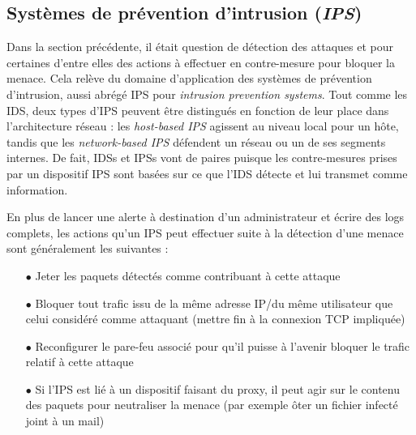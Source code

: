 \documentclass[]{article}
\begin{document}
\subsection{Systèmes de prévention d'intrusion (\textit{IPS})}\label{IPS}
\par Dans la section précédente, il était question de détection des attaques et pour certaines d'entre elles des actions à effectuer en contre-mesure pour bloquer la menace. Cela relève du domaine d'application des systèmes de prévention d'intrusion, aussi abrégé IPS pour \textit{intrusion prevention systems}. Tout comme les IDS, deux types d'IPS peuvent être distingués en fonction de leur place dans l'architecture réseau : les \textit{host-based IPS} agissent au niveau local pour un hôte, tandis que les \textit{network-based IPS} défendent un réseau ou un de ses segments internes. De fait, IDSs et IPSs vont de paires puisque les contre-mesures prises par un dispositif IPS sont basées sur ce que l'IDS détecte et lui transmet comme information.
\vspace{0.2cm}
\par En plus de lancer une alerte à destination d'un administrateur et écrire des logs complets,  les actions qu'un IPS peut effectuer suite à la détection d'une menace sont généralement les suivantes :
\vspace{0.2cm}
\begin{itemize}
\item[$\bullet$] Jeter les paquets détectés comme contribuant à cette attaque
\vspace{0.2cm}
\item[$\bullet$] Bloquer tout trafic issu de la même adresse IP/du même utilisateur que celui considéré comme attaquant (mettre fin à la connexion TCP impliquée)
\vspace{0.2cm}
\item[$\bullet$] Reconfigurer le pare-feu associé pour qu'il puisse à l'avenir bloquer le trafic relatif à cette attaque
\vspace{0.2cm}
\item[$\bullet$] Si l'IPS est lié à un dispositif faisant du proxy, il peut agir sur le contenu des paquets pour neutraliser la menace (par exemple ôter un fichier infecté joint à un mail)
\end{itemize}
\end{document}
